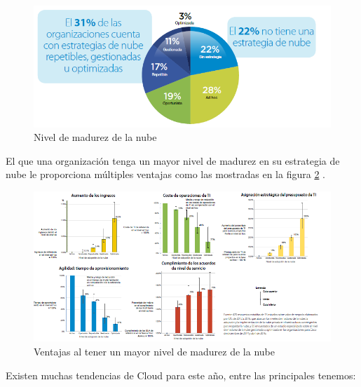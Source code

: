 \documentclass[a4paper, 12pt]{report}
\begin{document}
\begin{justify}
\begin{figure}[ht]
	\begin{center}
		\includegraphics[width=.8\textwidth]{madurezNube}
		\caption{Nivel de madurez de la nube}
		\label{fig:madurezNube}
	\end{center}
\end{figure}

El que una organizaci\'on tenga un mayor nivel de madurez en su estrategia de nube le proporciona m\'ultiples ventajas como las mostradas en la figura \ref{fig:ventajasMadurezNube} .\par

\begin{figure}[ht]
	\begin{center}
		\includegraphics[width=.8\textwidth]{ventajasMadurezNube}
		\caption{Ventajas al tener un mayor nivel de madurez de la nube}
		\label{fig:ventajasMadurezNube}
	\end{center}
\end{figure}

Existen muchas tendencias de Cloud para este a\~no, entre las principales tenemos:\par


\end{justify}
\end{document}
